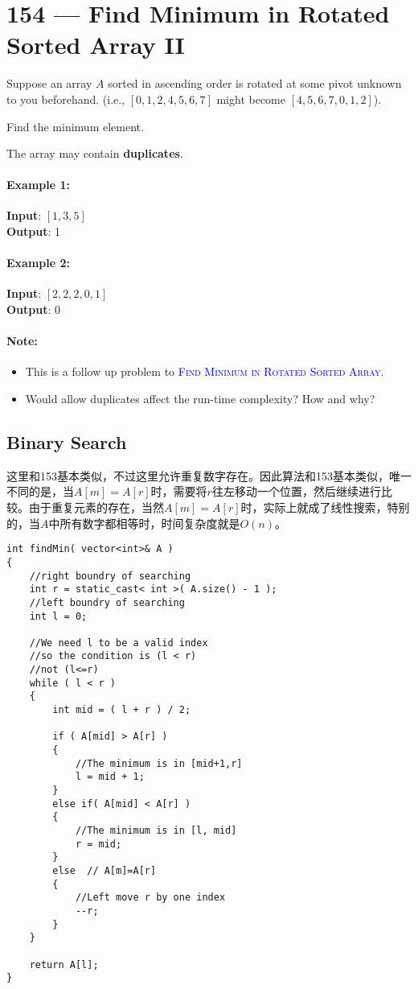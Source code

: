 \section{154 --- Find Minimum in Rotated Sorted Array II}
Suppose an array $A$ sorted in ascending order is rotated at some pivot unknown to you beforehand. (i.e.,  $[0,1,2,4,5,6,7]$ might become  $[4,5,6,7,0,1,2]$).
\par
Find the minimum element.
\par
The array may contain \textbf{duplicates}.
\paragraph{Example 1:}
\begin{flushleft}
\textbf{Input}: $[1,3,5]$
\\
\textbf{Output}: 1
\end{flushleft}
\paragraph{Example 2:}
\begin{flushleft}
\textbf{Input}: $[2,2,2,0,1]$
\\
\textbf{Output}: 0
\end{flushleft}
\paragraph{Note:}
\begin{itemize}
    \item This is a follow up problem to \textcolor{blue}{\textsc{Find Minimum in Rotated Sorted Array}}.
    \item Would allow duplicates affect the run-time complexity? How and why?
\end{itemize}
\subsection{Binary Search}
\begin{CJK*}{UTF8}{gbsn}
这里和153基本类似，不过这里允许重复数字存在。因此算法和153基本类似，唯一不同的是，当$A[m]=A[r]$时，需要将$r$往左移动一个位置，然后继续进行比较。由于重复元素的存在，当然$A[m]=A[r]$时，实际上就成了线性搜索，特别的，当$A$中所有数字都相等时，时间复杂度就是$O(n)$。
\end{CJK*}
\setcounter{lstlisting}{0}
\begin{lstlisting}[style=customc, caption={Binary Search}]
int findMin( vector<int>& A )
{
	//right boundry of searching
	int r = static_cast< int >( A.size() - 1 ); 
	//left boundry of searching
	int l = 0;

	//We need l to be a valid index 
	//so the condition is (l < r)
	//not (l<=r)
	while ( l < r )
	{
		int mid = ( l + r ) / 2;

		if ( A[mid] > A[r] )
		{
			//The minimum is in [mid+1,r]
			l = mid + 1;
		}
		else if( A[mid] < A[r] )
		{
			//The minimum is in [l, mid]
			r = mid;
		}
		else  // A[m]=A[r]
		{
			//Left move r by one index
			--r;
		}
	}

	return A[l];
}
\end{lstlisting}